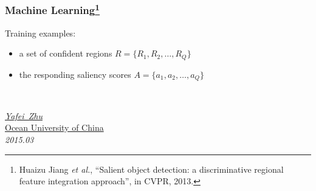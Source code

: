 \documentclass[notheorems,serif,table,compress]{beamer}  %
\newcommand\zhushadow[2][purple]{\hskip5pt\shadowbox{\color{#1}\small\kai #2\vspace{3mm}}}
\begin{document}
\begin{frame}
\frametitle{ Machine Learning\footnote{Huaizu Jiang \textit{et al.}, ``Salient object detection: a discriminative regional feature integration approach'', in CVPR, 2013.}}
Training examples: 
\begin{itemize}
\item a set of confident regions $R = \{ R_1, R_2, \ldots, R_Q\}$
\item the responding saliency scores $A = \{a_1, a_2, \ldots, a_Q\}$
\end{itemize}
\end{frame}


\begin{frame}
  \vspace{2cm}
  \centering
  \zhushadow{\color{blue}\Huge{Thanks}}\\
  \vspace{1.5cm}
  \begin{flushright}
  \emph{\href{zhuyafei4520@163.com}{Yafei~Zhu}}\\
  \href{http://www.ouc.edu.cn}{Ocean University of China}\\
  \emph{2015.03}
  \end{flushright}  
\end{frame}

\end{document}
